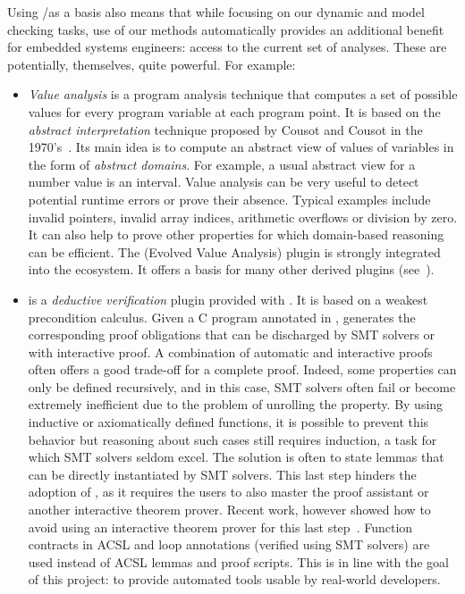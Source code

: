 Using \acsl/\framac as a basis also means that while focusing on our dynamic and model checking tasks, use of our methods automatically provides an additional benefit for embedded systems engineers: access to the current set of \framac analyses.  These are potentially, themselves, quite powerful.  For example:

\begin{itemize}
\item \emph{Value analysis} is a program analysis technique that computes a set of possible values for every program variable at each program point.
It is based on the \emph{abstract interpretation} technique proposed by Cousot and Cousot in the 1970's~\cite{cousot77}.
Its main idea is to compute an abstract view of values of variables in the form of \emph{abstract domains}.
For example, a usual abstract view for a number value is an interval.
Value analysis can be very useful to detect potential runtime errors or prove their absence.
Typical examples include invalid pointers, invalid array indices, arithmetic overflows or division by zero.
It can also help to prove other properties for which domain-based reasoning can be efficient.
The \Eva (Evolved Value Analysis) plugin is strongly integrated into the \framac ecosystem.
It offers a basis for many other derived plugins (see~\cite{KKP2015:FAC}).

\item \Wp is a \emph{deductive verification} plugin provided with \framac.
It is based on a weakest precondition calculus.
Given a C program annotated in \acsl, \Wp generates the corresponding proof obligations that can be discharged by SMT solvers or with interactive proof.
A combination of automatic and interactive proofs often offers a good trade-off for a complete proof.
Indeed, some properties can only be defined recursively, and in this case, SMT solvers often fail or become extremely inefficient due to the problem of unrolling the property.
By using inductive or axiomatically defined functions, it is possible to prevent this behavior but reasoning about such cases still requires induction, a task for which SMT solvers seldom excel.
The solution is often to state lemmas that can be directly instantiated by SMT solvers.
This last step hinders the adoption of \framac, as it requires the users to also master the \Coq proof assistant or another interactive theorem prover.
Recent work, however showed how to avoid using an interactive theorem prover for this last step~\cite{BLK2019:NFM}.
Function contracts in ACSL and loop annotations (verified using SMT solvers) are used instead of ACSL lemmas and \Coq proof scripts.
This is in line with the goal of this project: to provide automated tools usable by real-world developers.
\end{itemize}

